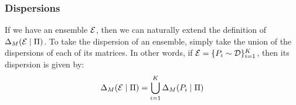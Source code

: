 \begin{frame} \frametitle{Dispersions}

\begin{alertblock}{}
If we have an ensemble $\mathcal{E}$, then we can naturally extend the definition of $\Delta_M(\mathcal{E} \mid \Pi)$.
To take the dispersion of an ensemble, simply take the union of the dispersions of each of its matrices.
In other words, if $\mathcal{E} = \{P_i \sim \mathcal{D}\}_{i = 1}^K$, then its dispersion is given by:
$$\Delta_M(\mathcal{E} \mid \Pi) = \bigcup_{i=1}^K \Delta_M(P_i \mid \Pi)$$
\end{alertblock}

\end{frame}






%
%



